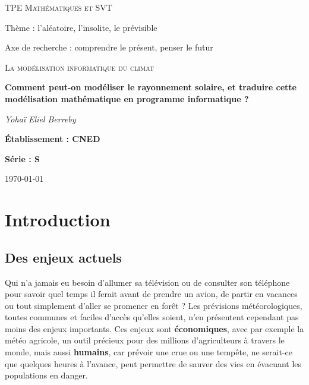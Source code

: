 \documentclass[12pt]{article}
\begin{document}

\begin{titlepage}
	\centering
	
	{\scshape\large TPE Mathématiques et SVT\par}
	\vspace{0.2cm}	
	{ \Large Thème : l'aléatoire, l'insolite, le prévisible\par }
	Axe de recherche : comprendre le présent, penser le futur\par
	\vspace{1.5cm}

	{\scshape\LARGE La modélisation informatique du climat \par}
	\vspace{1cm}
	{\huge\bfseries Comment peut-on modéliser le rayonnement solaire, et traduire cette modélisation mathématique en programme informatique ?\par}

	\vspace{1cm}
	{\Large\itshape Yohaï Eliel Berreby\par}
	
	\vfill
	
	
	{\Large\bfseries Établissement : CNED\par}
	\vspace{0.2cm}
	{\Large \bfseries Série : S }

	\vfill

	{\large \today\par}
\end{titlepage}


\clearpage
\tableofcontents{}
\clearpage


\section{Introduction} 

\subsection{Des enjeux actuels} %

Qui n'a jamais eu besoin d'allumer sa télévision ou de consulter son téléphone pour savoir quel temps il ferait avant de prendre un avion, de partir en vacances ou tout simplement d'aller se promener en forêt ?
Les prévisions météorologiques, toutes communes et faciles d'accès qu'elles soient, n'en présentent cependant pas moins des enjeux importants.
Ces enjeux sont \textbf{économiques}, avec par exemple la météo agricole, un outil précieux pour des millions d'agriculteurs à travers le monde, mais aussi \textbf{humains}, car prévoir une crue ou une tempête, ne serait-ce que quelques heures à l'avance, peut permettre de sauver des vies en évacuant les populations en danger.
\end{document}

